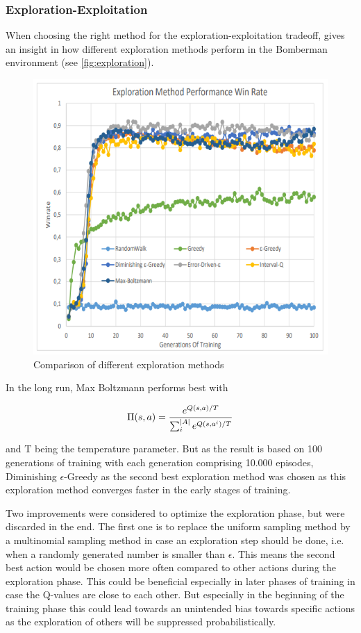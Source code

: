 \subsubsection{Exploration-Exploitation}
\label{ch:approachBa}

When choosing the right method for the exploration-exploitation tradeoff, \cite{Kormelink2018} gives an insight in how different exploration methods perform in the Bomberman environment (see \autoref{fig:exploration}). 

\begin{figure}[ht]
	\centering
	\includegraphics[width=0.6\linewidth]{figures/exploration.PNG}
	\caption{Comparison of different exploration methods \cite{Kormelink2018}}
	\label{fig:exploration}
\end{figure}

In the long run, Max Boltzmann performs best with 

\begin{equation}
	\Pi(s,a) = \frac{e^{Q(s,a)/T}}{\sum_i^{\lvert A\rvert}e^{Q(s,a^i)/T}}
\end{equation}

and T being the temperature parameter. But as the result is based on 100 generations of training with each generation comprising 10.000 episodes, Diminishing $\epsilon$-Greedy as the second best exploration method was chosen as this exploration method converges faster in the early stages of training.

Two improvements were considered to optimize the exploration phase, but were discarded in the end. The first one is to replace the uniform sampling method by a multinomial sampling method in case an exploration step should be done, i.e. when a randomly generated number is smaller than $\epsilon$. This means the second best action would be chosen more often compared to other actions during the exploration phase. This could be beneficial especially in later phases of training in case the Q-values are close to each other. But especially in the beginning of the training phase this could lead towards an unintended bias towards specific actions as the exploration of others will be suppressed probabilistically.

